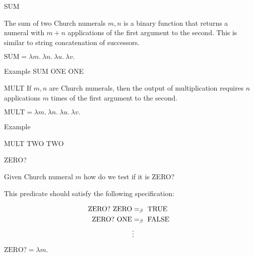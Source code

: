 \documentclass{beamer}
\begin{document}
\begin{frame}{SUM}

  The sum of two Church numerals $m,n$ is a binary function that returns a numeral with $m+n$ applications of the first argument to the second. This is similar to string concatenation of successors.
  
  \vspace{0.3cm}
  
  $\text{SUM} = \lambda m. \ \lambda n. \ \lambda u. \ \lambda v. \ $
  
  \vspace{5cm}

\end{frame}

\begin{frame}{Example}
  SUM ONE ONE
  
  \vspace{7cm} 
\end{frame}

\begin{frame}{MULT}
  If $m,n$ are Church numerals, then the output of multiplication requires $n$ applications $m$ times of the first argument to the second. 
  
  \vspace{0.3cm}
  
  $\text{MULT} = \lambda m. \ \lambda n. \ \lambda u. \ \lambda v. \ $
  
  \vspace{6cm}      
\end{frame}

\begin{frame}{Example}

  MULT TWO TWO
  
  \vspace{7cm}   
  
\end{frame}

\begin{frame}{ZERO?}
  
  Given Church numeral $m$ how do we test if it is ZERO?
  
  \vspace{0.3cm}

  This predicate should satisfy the following specification:
  
  	\begin{align*}
		\text{ZERO?} \ \text{ZERO} &=_{\beta} \ \text{TRUE} \\
		\text{ZERO?} \ \text{ONE} &=_{\beta} \ \text{FALSE} \\
		&\vdots
	\end{align*}
  
  $\text{ZERO?} = \lambda m.  \ $
  
  \vspace{2cm}  
  
\end{frame}
\end{document}
